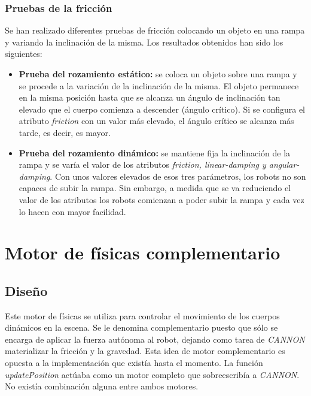 \subsubsection{Pruebas de la fricción}
Se han realizado diferentes pruebas de fricción colocando un objeto en una rampa y variando la inclinación de la misma. Los resultados obtenidos han sido los siguientes:
\begin{itemize}
    \item \textbf{Prueba del rozamiento estático: } se coloca un objeto sobre una rampa y se procede a la variación de la inclinación de la misma. El objeto permanece en la misma posición hasta que se alcanza un ángulo de inclinación tan elevado que el cuerpo comienza a descender (ángulo crítico). Si se configura el atributo \textit{friction} con un valor más elevado, el ángulo crítico se alcanza más tarde, es decir, es mayor.
    \item \textbf{Prueba del rozamiento dinámico: } se mantiene fija la inclinación de la rampa y se varía el valor de los atributos \textit{friction, linear-damping y angular-damping}. Con unos valores elevados de esos tres parámetros, los robots no son capaces de subir la rampa. Sin embargo, a medida que se va reduciendo el valor de los atributos los robots comienzan a poder subir la rampa y cada vez lo hacen con mayor facilidad.
\end{itemize}

\section{Motor de físicas complementario}
\subsection{Diseño}
Este motor de físicas se utiliza para controlar el movimiento de los cuerpos dinámicos en la escena. Se le denomina complementario puesto que sólo se encarga de aplicar la fuerza autónoma al robot, dejando como tarea de \textit{CANNON} materializar la fricción y la gravedad. Esta idea de motor complementario es opuesta a la implementación que existía hasta el momento. La función \textit{updatePosition} actúaba como un motor completo que sobreescribía a \textit{CANNON}. No existía combinación alguna entre ambos motores. \newline


